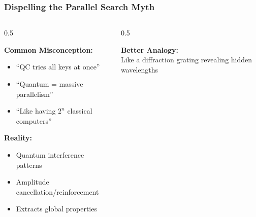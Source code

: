 \documentclass[aspectratio=169,10pt]{beamer}
\newcommand{\teaching}[1]{}
\newcommand{\slideheader}[1]{\frametitle{#1}}
\theoremstyle{plain}
\begin{document}
\begin{frame}
  \slideheader{Dispelling the Parallel Search Myth}
  
  \begin{columns}[T]
    \begin{column}{0.5\textwidth}

    \begin{blueBox}
      \textbf{Common Misconception:}
      \begin{itemize}
        \item ``QC tries all keys at once''
        \item ``Quantum = massive parallelism''
        \item ``Like having $2^n$ classical computers''
      \end{itemize}
    \end{blueBox}
    
    \vspace{0.5cm}
    
    \begin{redBox}
      \textbf{Reality:}
      \begin{itemize}
        \item Quantum interference patterns
        \item Amplitude cancellation/reinforcement
        \item Extracts global properties
      \end{itemize}
    \end{redBox}
  
    \end{column}
    \begin{column}{0.5\textwidth}

    
    \vspace{0.3cm}
    
    \begin{greenBox}
      \textbf{Better Analogy:}\\
      Like a diffraction grating revealing hidden wavelengths
    \end{greenBox}
  
    \end{column}
  \end{columns}
  
  \teaching{Correct fundamental misunderstanding early}
\end{frame}
\end{document}
